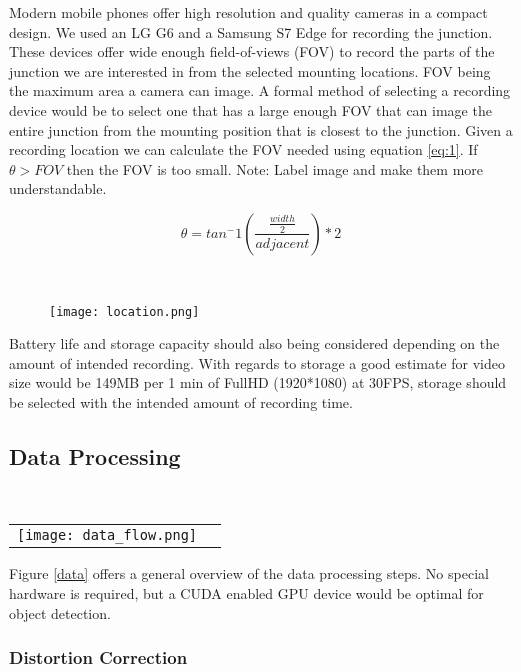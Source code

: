 Modern mobile phones offer high resolution and quality cameras in a compact design. We used an LG G6 and a Samsung S7 Edge for recording the junction.
These devices offer wide enough field-of-views (FOV) to record the parts of the junction we are interested in from the selected mounting locations.
FOV being the maximum area a camera can image. A formal method of selecting a recording device would be to select one that has a large enough FOV that can image the entire junction 
from the mounting position that is closest to the junction. Given a recording location we can calculate the FOV needed using equation \ref{eq:1}.
If $\theta > FOV$ then the FOV is too small. 
Note: Label image and make them more understandable.

\begin{equation}
    \theta = tan^-1(\frac{\frac{width}{2}}{adjacent}) * 2\label{eq:1}
  \end{equation}

\ \\ 
  \begin{figure}[h]
    \texttt{[image: location.png]}
    \centering 
    \end{figure}
    \label{Camera location}

Battery life and storage capacity should also being considered depending on the amount of intended recording. 
With regards to storage a good estimate for video size would be 149MB per 1 min of FullHD (1920*1080) at 30FPS, storage should be selected
with the intended amount of recording time.

\subsection{Data Processing}

\ \\ 
\noindent
\begin{tabular}{@{}cc}
\texttt{[image: data\_flow.png]} 
\end{tabular}
\label{data}


Figure \ref{data} offers a general overview of the data processing steps. No special hardware is required, but a CUDA enabled GPU
device would be optimal for object detection.
\ \\
\subsubsection{Distortion Correction}

